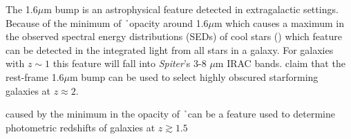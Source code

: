 The 1.6$\mu$m bump is an astrophysical feature detected in extragalactic settings.  Because of the minimum of \h\ opacity around 1.6$\mu$m which causes a maximum in the observed spectral energy distributions (SEDs) of cool stars (\citealt{sawicki2002}) which feature can be detected in the integrated light from all stars in a galaxy.  For galaxies with $z\sim1$ this feature will fall into {\it Spiter}'s 3-8 $\mu$m IRAC bands.  \cite{desai2009} claim that the rest-frame 1.6$\mu$m bump can be used to select highly obscured starforming galaxies at $z\approx 2$.  %

caused by the minimum in the opacity of \h\ can be a feature used to determine photometric redshifts of galaxies at $z\gtrsim1.5$
